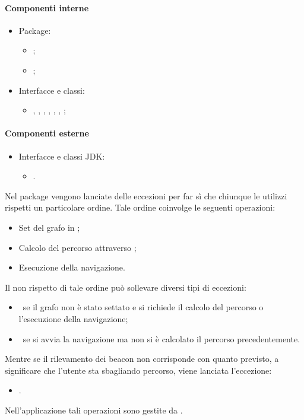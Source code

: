 \documentclass[../Funzionalita.tex]{subfiles}
\begin{document}
		\paragraph*{Componenti interne}
			\begin{itemize}
			
				\item Package:
				\begin{itemize}
					\item[] \model;
					\item[] \navigator;
				\end{itemize}
				
				\item Interfacce e classi:
				\begin{itemize}
					\item[] \NavigationManagerImp, \Navigator, \NavigatorImp, \NavigationExceptions, \NoGraphSetException, \PathException, \NoNavigationInformationException;
				\end{itemize}
				
			\end{itemize}
			
			
			\paragraph*{Componenti esterne}
			\begin{itemize}
			
				\item Interfacce e classi JDK:
				\begin{itemize}
					\item[] \Exception.
				\end{itemize}
				
			\end{itemize}
			
			Nel package \navigator vengono lanciate delle eccezioni per far sì che chiunque le utilizzi rispetti un particolare ordine. Tale ordine coinvolge le seguenti operazioni:
			\begin{itemize}
				\item Set del grafo in \NavigatorImp;
				\item Calcolo del percorso attraverso \NavigatorImp;
				\item Esecuzione della navigazione.
			\end{itemize}
			Il non rispetto di tale ordine può sollevare diversi tipi di eccezioni:
			\begin{itemize}
				\item \NoGraphSetException\ se il grafo non è stato settato e si richiede il calcolo del percorso o l'esecuzione della navigazione;
				\item \NoNavigationInformationException\ se si avvia la navigazione ma non si è calcolato il percorso precedentemente.
			\end{itemize}
			Mentre se il rilevamento dei beacon non corrisponde con quanto previsto, a significare che l'utente sta sbagliando percorso, viene lanciata l'eccezione:
			\begin{itemize}
				\item \PathException.
			\end{itemize}
			Nell'applicazione tali operazioni sono gestite da \NavigationManagerImp.
\end{document}
